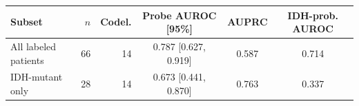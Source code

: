 \begin{tabular}{lrrccc}
\toprule
Subset & $n$ & Codel. & Probe AUROC [95\%] & AUPRC & IDH-prob. AUROC \\
\midrule
All labeled patients & 66 & 14 & 0.787 [0.627, 0.919] & 0.587 & 0.714 \\
IDH-mutant only & 28 & 14 & 0.673 [0.441, 0.870] & 0.763 & 0.337 \\
\bottomrule
\end{tabular}
